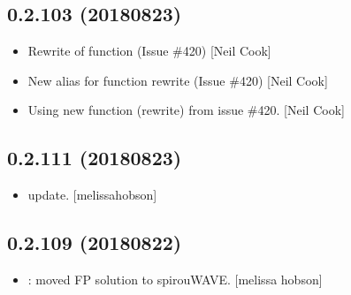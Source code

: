 \documentclass[a4paper,10pt,english]{report}
\begin{document}
\subsection{0.2.103 (2018\sphinxhyphen{}08\sphinxhyphen{}23)}
\label{\detokenize{misc/changelog:id375}}\begin{itemize}
\item {} 
Re\sphinxhyphen{}write of  function (Issue \#420) {[}Neil Cook{]}

\item {} 
New alias for function re\sphinxhyphen{}write (Issue \#420) {[}Neil Cook{]}

\item {} 
Using new function (re\sphinxhyphen{}write) from issue \#420. {[}Neil Cook{]}

\end{itemize}


\subsection{0.2.111 (2018\sphinxhyphen{}08\sphinxhyphen{}23)}
\label{\detokenize{misc/changelog:id376}}\begin{itemize}
\item {} 
 update. {[}melissa\sphinxhyphen{}hobson{]}

\end{itemize}


\subsection{0.2.109 (2018\sphinxhyphen{}08\sphinxhyphen{}22)}
\label{\detokenize{misc/changelog:id377}}\begin{itemize}
\item {} 
: moved FP solution to spirouWAVE. {[}melissa\sphinxhyphen{}
hobson{]}

\end{itemize}
\end{document}
